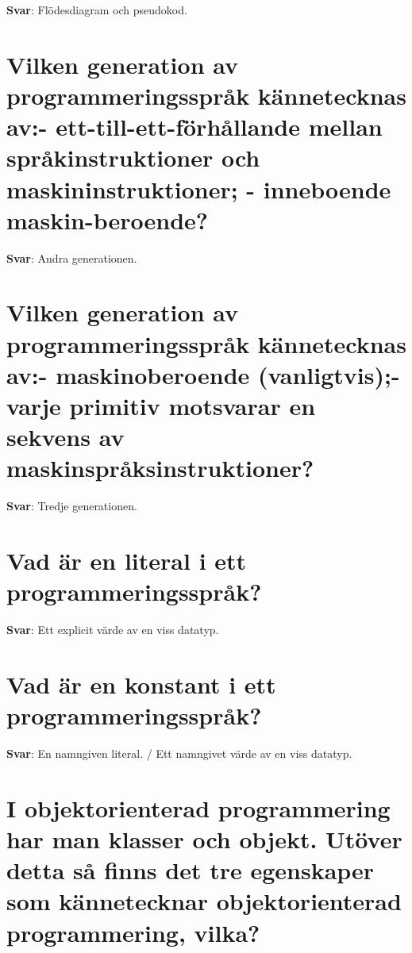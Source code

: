 \documentclass[a4paper,11pt,oneside]{book}
\begin{document}
\begin{sloppypar}
\label{q:208:sa:sv:True}

\textbf{Svar}: Fl\"odesdiagram och pseudokod.



\section{Vilken generation av programmeringsspr\r{a}k k\"annetecknas av:- ett-till-ett-f\"orh\r{a}llande mellan spr\r{a}kinstruktioner och maskininstruktioner; - inneboende maskin-beroende?}

\label{q:209:sa:sv:True}

\textbf{Svar}: Andra generationen.



\section{Vilken generation av programmeringsspr\r{a}k k\"annetecknas av:- maskinoberoende (vanligtvis);- varje primitiv motsvarar en sekvens av maskinspr\r{a}ksinstruktioner?}

\label{q:210:sa:sv:True}

\textbf{Svar}: Tredje generationen.



\section{Vad \"ar en literal i ett programmeringsspr\r{a}k?}

\label{q:211:sa:sv:True}

\textbf{Svar}: Ett explicit v\"arde av en viss datatyp.



\section{Vad \"ar en konstant i ett programmeringsspr\r{a}k?}

\label{q:212:sa:sv:True}

\textbf{Svar}: En namngiven literal. / Ett namngivet v\"arde av en viss datatyp.



\section{I objektorienterad programmering har man klasser och objekt. Ut\"over detta s\r{a} finns det tre egenskaper som k\"annetecknar objektorienterad programmering, vilka?}


\end{sloppypar}
\end{document}
